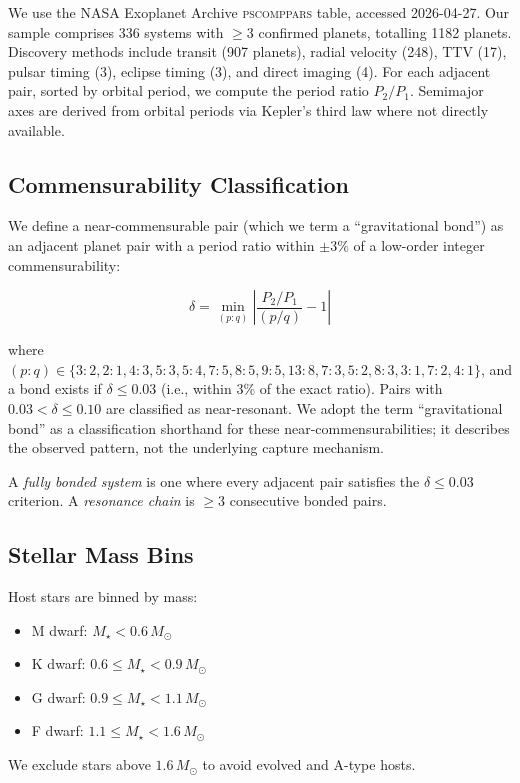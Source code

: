 \documentclass[twocolumn,usenatbib]{mnras}
\begin{document}
We use the NASA Exoplanet Archive \textsc{pscomppars} table, accessed
2026-04-27. Our sample comprises 336 systems with $\geq 3$ confirmed planets,
totalling 1182 planets. Discovery methods include transit (907 planets),
radial velocity (248), TTV (17), pulsar timing (3), eclipse timing (3), and
direct imaging (4). For each adjacent pair, sorted by orbital period, we
compute the period ratio $P_2/P_1$. Semimajor axes are derived from orbital
periods via Kepler's third law where not directly available.

\subsection{Commensurability Classification}

We define a near-commensurable pair (which we term a
``gravitational bond'') as an adjacent planet pair with a period ratio within
$\pm 3\%$ of a low-order integer commensurability:

\begin{equation}
\delta = \min_{(p:q)} \left| \frac{P_2/P_1}{(p/q)} - 1 \right|
\label{eq:delta}
\end{equation}

where $(p:q) \in \{3:2, 2:1, 4:3, 5:3, 5:4, 7:5, 8:5, 9:5, 13:8, 7:3, 5:2, 8:3,
3:1, 7:2, 4:1\}$, and a bond exists if $\delta \leq 0.03$ (i.e., within 3\%
of the exact ratio). Pairs with $0.03 < \delta \leq 0.10$ are classified as
near-resonant. We adopt the term ``gravitational bond'' as a classification
shorthand for these near-commensurabilities; it describes the observed pattern,
not the underlying capture mechanism.

A \textit{fully bonded system} is one where every adjacent pair satisfies the
$\delta \leq 0.03$ criterion. A \textit{resonance chain} is $\geq 3$
consecutive bonded pairs.

\subsection{Stellar Mass Bins}

Host stars are binned by mass:
\begin{itemize}
  \item M dwarf: $M_\star < 0.6\,M_\odot$
  \item K dwarf: $0.6 \leq M_\star < 0.9\,M_\odot$
  \item G dwarf: $0.9 \leq M_\star < 1.1\,M_\odot$
  \item F dwarf: $1.1 \leq M_\star < 1.6\,M_\odot$
\end{itemize}
We exclude stars above $1.6\,M_\odot$ to avoid evolved and A-type hosts.
\end{document}
